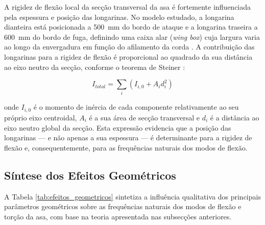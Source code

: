 \documentclass[11pt,twoside,a4paper]{report}
\begin{document}
A rigidez de flexão local da secção transversal da asa é fortemente influenciada pela espessura e posição das longarinas. No modelo estudado, a longarina dianteira está posicionada a \SI{500}{\milli\meter} do bordo de ataque e a longarina traseira a \SI{600}{\milli\meter} do bordo de fuga, definindo uma caixa alar (\textit{wing box}) cuja largura varia ao longo da envergadura em função do afilamento da corda \cite{Megson2012}. A contribuição das longarinas para a rigidez de flexão é proporcional ao quadrado da sua distância ao eixo neutro da secção, conforme o teorema de Steiner \cite{Rao2011}:

\begin{equation}
    I_{total} = \sum_i \left( I_{i,0} + A_i d_i^2 \right)
    \label{eq:steiner}
\end{equation}

\noindent onde $I_{i,0}$ é o momento de inércia de cada componente relativamente ao seu próprio eixo centroidal, $A_i$ é a sua área de secção transversal e $d_i$ é a distância ao eixo neutro global da secção. Esta expressão evidencia que a posição das longarinas --- e não apenas a sua espessura --- é determinante para a rigidez de flexão e, consequentemente, para as frequências naturais dos modos de flexão.

\subsection{Síntese dos Efeitos Geométricos}

A Tabela \ref{tab:efeitos_geometricos} sintetiza a influência qualitativa dos principais parâmetros geométricos sobre as frequências naturais dos modos de flexão e torção da asa, com base na teoria apresentada nas subsecções anteriores.
\end{document}
